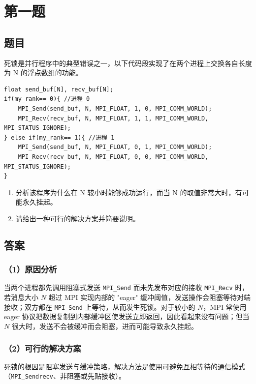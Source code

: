 \chapter{第一题}

\section{题目}

死锁是并行程序中的典型错误之一，以下代码段实现了在两个进程上交换各自长度为 N 的浮点数组的功能。
\begin{lstlisting}[style=cleancpp]
float send_buf[N], recv_buf[N];
if(my_rank== 0){ //进程 0 
    MPI_Send(send_buf, N, MPI_FLOAT, 1, 0, MPI_COMM_WORLD); 
    MPI_Recv(recv_buf, N, MPI_FLOAT, 1, 1, MPI_COMM_WORLD, MPI_STATUS_IGNORE); 
} else if(my_rank== 1){ //进程 1 
    MPI_Send(send_buf, N, MPI_FLOAT, 0, 1, MPI_COMM_WORLD); 
    MPI_Recv(recv_buf, N, MPI_FLOAT, 0, 0, MPI_COMM_WORLD, MPI_STATUS_IGNORE); 
}
\end{lstlisting}

\begin{enumerate}
    \item 分析该程序为什么在 N 较小时能够成功运行，而当 N 的取值非常大时，有可能永久挂起。
    \item 请给出一种可行的解决方案并简要说明。
\end{enumerate}

\section{答案}
\subsection{（1）原因分析} 

当两个进程都先调用阻塞式发送 \texttt{MPI\_Send} 而未先发布对应的接收 \texttt{MPI\_Recv} 时，若消息大小 $N$ 超过 MPI 实现内部的 "eager" 缓冲阈值，发送操作会阻塞等待对端接收；双方都在 \texttt{MPI\_Send} 上等待，从而发生死锁。对于较小的 $N$，MPI 常使用 eager 协议把数据复制到内部缓冲区使发送立即返回，因此看起来没有问题；但当 $N$ 很大时，发送不会被缓冲而会阻塞，进而可能导致永久挂起。

\subsection{（2）可行的解决方案}
死锁的根因是阻塞发送与缓冲策略，解决方法是使用可避免互相等待的通信模式（\texttt{MPI\_Sendrecv}、非阻塞或先贴接收）。



